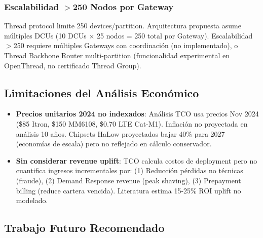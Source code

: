 \subsubsection{Escalabilidad $>$250 Nodos por Gateway}

Thread protocol limite 250 devices/partition. Arquitectura propuesta asume múltiples DCUs (10 DCUs $\times$ 25 nodos = 250 total por Gateway). Escalabilidad $>$250 requiere múltiples Gateways con coordinación (no implementado), o Thread Backbone Router multi-partition (funcionalidad experimental en OpenThread, no certificado Thread Group).

\subsection{Limitaciones del Análisis Económico}

\begin{itemize}
    \item \textbf{Precios unitarios 2024 no indexados}: Análisis TCO usa precios Nov 2024 (\$85 Itron, \$150 MM6108, \$0.70 LTE Cat-M1). Inflación no proyectada en análisis 10 años. Chipsets HaLow proyectados bajar 40\% para 2027 (economías de escala) pero no reflejado en cálculo conservador.
    
    \item \textbf{Sin considerar revenue uplift}: TCO calcula costos de deployment pero no cuantifica ingresos incrementales por: (1) Reducción pérdidas no técnicas (fraude), (2) Demand Response revenue (peak shaving), (3) Prepayment billing (reduce cartera vencida). Literatura estima 15-25\% ROI uplift no modelado.
\end{itemize}

\subsection{Trabajo Futuro Recomendado}

